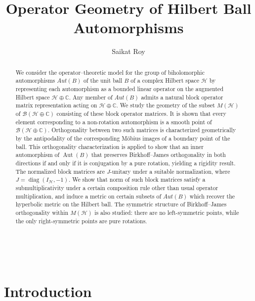 \documentclass[12pt]{amsart}
\title[Geometric Properties of $\Aut(B)$]
{Operator Geometry of Hilbert Ball Automorphisms\\}
\author{Saikat Roy}
\theoremstyle{definition}
\renewcommand{\H}{\mathcal{H}}
\newcommand{\Aut}{\operatorname{Aut}}
\begin{document}
\hfill\\


\bigskip


\begin{abstract}
We consider the operator--theoretic model for the group of biholomorphic
automorphisms $Aut(B)$ of the unit ball $B$ of a complex Hilbert space $\H$ by representing each automorphism as a bounded linear operator on the augmented Hilbert space $\H\oplus \mathbb{C}$. Any member of $Aut(B)$ admits a natural block operator matrix representation acting on $\mathcal{H}\oplus\mathbb{C}$. We study the geometry of the subset
$M(\mathcal{H})$ of $\mathcal{B}(\mathcal{H}\oplus\mathbb{C})$ consisting
of these block operator matrices. It is shown that every element
corresponding to a non-rotation automorphism is a smooth point of
$\mathcal{B}(\mathcal{H}\oplus\mathbb{C})$. Orthogonality between two
such matrices is characterized geometrically by the antipodality of the
corresponding M\"{o}bius images of a boundary point of the ball. This
orthogonality characterization is applied to show that an inner
automorphism of $\Aut(B)$ that preserves Birkhoff--James orthogonality in both directions if and only if it is
conjugation by a pure rotation, yielding a rigidity result. The
normalized block matrices are $J$-unitary under a suitable normalization, where $J = \operatorname{diag}(I_{\mathcal{H}}, -1)$. We show that norm of such block matrices satisfy a submultiplicativity under a certain composition rule other than usual operator multiplication, and induce a metric on certain subsets of $Aut(B)$ which recover
the hyperbolic metric on the Hilbert ball. The symmetric
structure of Birkhoff--James orthogonality within $M(\mathcal{H})$ is
also studied: there are no left-symmetric points, while the only right-symmetric
points are pure rotations.
\end{abstract}


\medskip


\maketitle


\section{Introduction}
\end{document}
